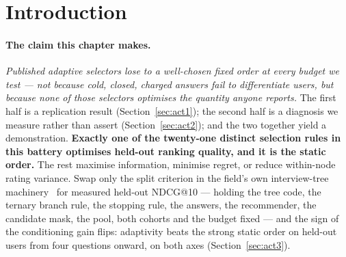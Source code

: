 \documentclass[11pt]{article}
\begin{document}
\begin{abstract}
{onward on both axes} ($+0.01035$ full $[+0.00739,+0.01323]$ and $+0.00705$ tail at sixteen), while the
two published surrogates lose by three times that margin. The magnitude travels with the claim: the gain is
about a tenth of the interview's own lift, smaller than the gain from changing the question bank with
no conditioning at all ($+0.01430$ at equal budget), zero at one question by construction, behind on
the tail at two, and $39.3\%$ of the test cohort sits in a leaf that loses. Finally, conditioning does
not touch \emph{reach}: $\sim\!14\%$ of cold users answer nothing across sixteen charged questions,
and users who answer sit roughly $+0.25$ above users who do not, against $+0.048$ for the best
question \emph{choice}. A closing section addresses reach with volunteered openings: interviews
fitted at the states of users who volunteer an opening request beat the cold interview there
($+0.01041$ pooled, test), and a single policy distilled from all seven interviews, choosing each question
from the folded state alone, retains the advantage on the reserved test cohort ($+0.00343$) while
leaving the majority who volunteer nothing unharmed.
\end{abstract}

\section{Introduction}

\paragraph{The claim this chapter makes.} \emph{Published adaptive selectors lose to a well-chosen
fixed order at every budget we test --- not because cold, closed, charged answers fail to
differentiate users, but because none of those selectors optimises the quantity anyone reports.} The
first half is a replication result (Section~\ref{sec:act1}); the second half is a diagnosis we
measure rather than assert (Section~\ref{sec:act2}); and the two together yield a demonstration.
\textbf{Exactly one of the twenty-one distinct selection rules in this battery optimises held-out
ranking quality, and it is the static order.} The rest maximise information, minimise regret, or
reduce within-node rating variance. Swap only the split criterion in the field's own interview-tree
machinery~\cite{golbandi2011adaptive} for measured held-out NDCG@10 --- holding the tree code, the
ternary branch rule, the stopping rule, the answers, the recommender, the candidate mask, the pool,
both cohorts and the budget fixed --- and the sign of the conditioning gain flips: adaptivity beats
the strong static order on held-out users from four questions onward, on both axes
(Section~\ref{sec:act3}).
\end{document}
